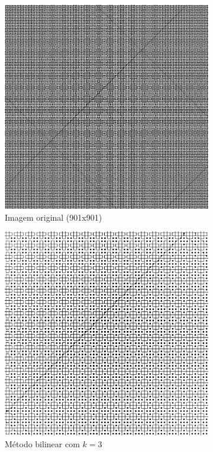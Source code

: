 \documentclass[leqno]{article}
\begin{document}
\begin{figure}[H]
    \centering
    \begin{subfigure}{.33\textwidth}
      \centering
      \includegraphics[width=.7\linewidth]{../images/func_1.png}
      \caption{Imagem original  (901x901) }
      \label{fig:sub1}
    \end{subfigure}%
    \begin{subfigure}{.33\textwidth}
      \centering
      \includegraphics[width=.7\linewidth]{../images/func_1_bil.png}
      \caption{Método bilinear com $k = 3$}
      \label{fig:sub2}
    \end{subfigure}
    \begin{subfigure}{.33\textwidth}
        \centering

\end{subfigure}
\end{figure}
\end{document}

